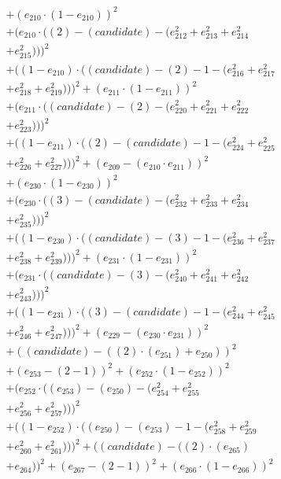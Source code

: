 \documentclass[10pt, a4paper]{article}
\begin{document}
\begin{small}
\begin{align*}
& + (e_{210}  \cdot  (1 - e_{210}))^{2} \\
& + (e_{210}  \cdot  ((2) - (candidate) - (e_{212}^{2} + e_{213}^{2} + e_{214}^{2} \\
& + e_{215}^{2})))^{2} \\
& + ((1 - e_{210})  \cdot  ((candidate) - (2) - 1 - (e_{216}^{2} + e_{217}^{2} \\
& + e_{218}^{2} + e_{219}^{2})))^{2} + (e_{211}  \cdot  (1 - e_{211}))^{2} \\
& + (e_{211}  \cdot  ((candidate) - (2) - (e_{220}^{2} + e_{221}^{2} + e_{222}^{2} \\
& + e_{223}^{2})))^{2} \\
& + ((1 - e_{211})  \cdot  ((2) - (candidate) - 1 - (e_{224}^{2} + e_{225}^{2} \\
& + e_{226}^{2} + e_{227}^{2})))^{2} + (e_{209} - (e_{210}  \cdot  e_{211}))^{2} \\
& + (e_{230}  \cdot  (1 - e_{230}))^{2} \\
& + (e_{230}  \cdot  ((3) - (candidate) - (e_{232}^{2} + e_{233}^{2} + e_{234}^{2} \\
& + e_{235}^{2})))^{2} \\
& + ((1 - e_{230})  \cdot  ((candidate) - (3) - 1 - (e_{236}^{2} + e_{237}^{2} \\
& + e_{238}^{2} + e_{239}^{2})))^{2} + (e_{231}  \cdot  (1 - e_{231}))^{2} \\
& + (e_{231}  \cdot  ((candidate) - (3) - (e_{240}^{2} + e_{241}^{2} + e_{242}^{2} \\
& + e_{243}^{2})))^{2} \\
& + ((1 - e_{231})  \cdot  ((3) - (candidate) - 1 - (e_{244}^{2} + e_{245}^{2} \\
& + e_{246}^{2} + e_{247}^{2})))^{2} + (e_{229} - (e_{230}  \cdot  e_{231}))^{2} \\
& + ((candidate) - ((2)  \cdot  (e_{251}) + e_{250}))^{2} \\
& + (e_{253} - (2 - 1))^{2} + (e_{252}  \cdot  (1 - e_{252}))^{2} \\
& + (e_{252}  \cdot  ((e_{253}) - (e_{250}) - (e_{254}^{2} + e_{255}^{2} \\
& + e_{256}^{2} + e_{257}^{2})))^{2} \\
& + ((1 - e_{252})  \cdot  ((e_{250}) - (e_{253}) - 1 - (e_{258}^{2} + e_{259}^{2} \\
& + e_{260}^{2} + e_{261}^{2})))^{2} + ((candidate) - ((2)  \cdot  (e_{265}) \\
& + e_{264}))^{2} + (e_{267} - (2 - 1))^{2} + (e_{266}  \cdot  (1 - e_{266}))^{2} \\

\end{align*}
\end{small}
\end{document}
